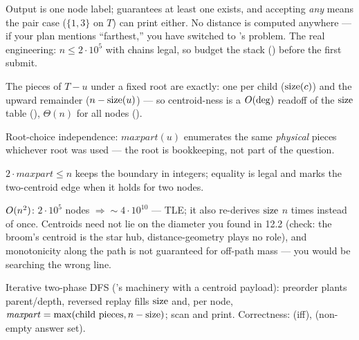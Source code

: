 Output is one node label;  guarantees at least one exists, and
accepting \emph{any} means the pair case ($\{1,3\}$ on $T$) can print either. No
distance is computed anywhere --- if your plan mentions ``farthest,'' you have switched
to 's problem. The real engineering: $n \le 2\cdot 10^5$ with chains
legal, so budget the stack () before the first submit.

\begin{observation}
The pieces of $T-u$ under a fixed root are exactly: one per child ($\operatorname{size}(c)$) and the
upward remainder ($n - \operatorname{size}(u)$) --- so centroid-ness is a $O(\deg)$ readoff of the
$\operatorname{size}$ table (), $\Theta(n)$ for all nodes ().
\end{observation}
\begin{observation}
Root-choice independence: $\mathit{maxpart}(u)$ enumerates the same \emph{physical}
pieces whichever root was used --- the root is bookkeeping, not part of the question.
\end{observation}
\begin{observation}
$2 \cdot \mathit{maxpart} \le n$ keeps the boundary in integers; equality is legal and
marks the two-centroid edge when it holds for two nodes.
\end{observation}

\begin{thinkbox}
{$O(n^2)$: $2\cdot 10^5$ nodes $\Rightarrow \sim 4\cdot 10^{10}$ --- TLE; it also
re-derives $\operatorname{size}$ $n$ times instead of once.}
{Centroids need not lie on the diameter you found in 12.2 (check: the broom's centroid
is the star hub, distance-geometry plays no role), and monotonicity along the path is
not guaranteed for off-path mass --- you would be searching the wrong line.}
\end{thinkbox}

Iterative two-phase DFS ('s machinery with a centroid payload):
preorder plants parent/depth, reversed replay fills $\operatorname{size}$ and, per node,
$\mathit{maxpart} = \max(\text{child pieces}, n - \operatorname{size})$; scan and print. Correctness:
 (iff),  (non-empty answer set).

